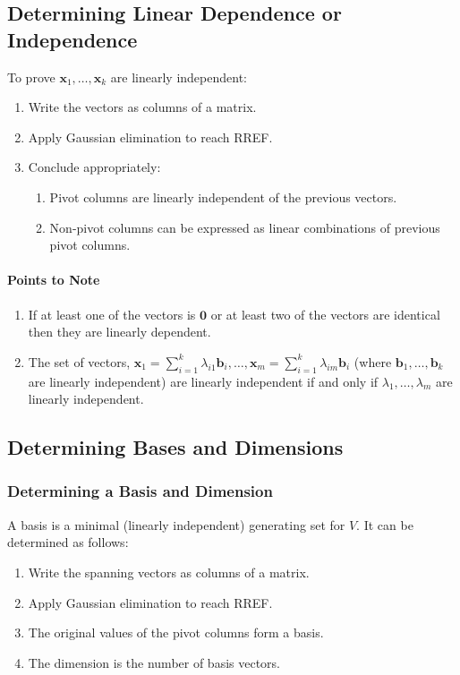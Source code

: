 \documentclass[10pt,twoside,twocolumn]{article}
\begin{document}
\subsection{Determining Linear Dependence or Independence}

To prove $\mathbf{x}_{1},\dots,\mathbf{x}_{k}$ are linearly independent: 
\begin{enumerate}
\item Write the vectors as columns of a matrix. 
\item Apply Gaussian elimination to reach RREF. 
\item Conclude appropriately:

\begin{enumerate}
\item Pivot columns are linearly independent of the previous vectors. 
\item Non-pivot columns can be expressed as linear combinations of previous
pivot columns. 
\end{enumerate}
\end{enumerate}

\paragraph{Points to Note}
\begin{enumerate}
\item If at least one of the vectors is $\mathbf{0}$ or at least two of
the vectors are identical then they are linearly dependent. 
\item The set of vectors, $\mathbf{x}_{1}=\sum_{i=1}^{k}\lambda_{i1}\mathbf{b}_{i},\dots,\mathbf{x}_{m}=\sum_{i=1}^{k}\lambda_{im}\mathbf{b}_{i}$
(where $\mathbf{b}_{1},\dots,\mathbf{b}_{k}$ are linearly independent)
are linearly independent if and only if $\lambda_{1},\dots,\lambda_{m}$
are linearly independent. 
\end{enumerate}

\subsection{Determining Bases and Dimensions}


\subsubsection{Determining a Basis and Dimension}

A basis is a minimal (linearly independent) generating set for $V$.
It can be determined as follows: 
\begin{enumerate}
\item Write the spanning vectors as columns of a matrix. 
\item Apply Gaussian elimination to reach RREF. 
\item The original values of the pivot columns form a basis. 
\item The dimension is the number of basis vectors. 
\end{enumerate}
\end{document}
